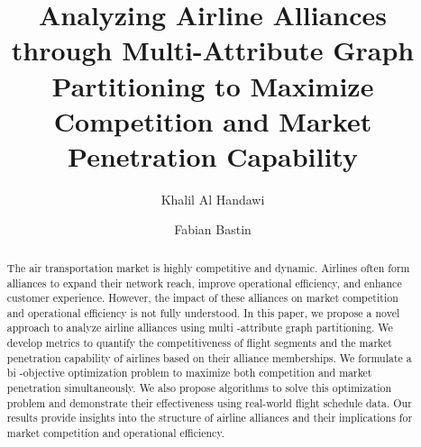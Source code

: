 \documentclass[preprint,times]{elsarticle}
\def\mfabian#1{{\color{black} #1}}
\begin{document}
\begin{frontmatter}




\title{Analyzing Airline Alliances through Multi-Attribute Graph Partitioning to Maximize Competition and Market Penetration Capability}




\author[a]{Khalil Al Handawi} 
\author[b]{Fabian Bastin}

\address[a]{McGill University, Department of Mechanical Engineering, Macdonald-Stewart Building, 817 Sherbrooke W., Montreal, QC, Canada H3A 2T7}
\address[b]{University of Montreal, Department of Computer Science And Operations Research, CP 6128 Succ Centre-Ville, Montreal, QC, Canada  H3C 3J7}

\begin{abstract}

The air transportation market is highly competitive and dynamic. Airlines often form alliances to expand their network reach, improve operational efficiency, and enhance customer experience. However, the impact of these alliances on market competition and operational efficiency is not fully understood. In this paper, we propose a novel approach to analyze airline alliances using multi\mfabian{-}attribute graph partitioning. We develop metrics to quantify the competitiveness of flight segments and the market penetration capability of airlines based on their alliance memberships. We formulate a bi\mfabian{-}objective optimization problem to maximize both competition and market penetration simultaneously. We also propose algorithms to solve this optimization problem and demonstrate their effectiveness using real-world flight schedule data. Our results provide insights into the structure of airline alliances and their implications for market competition and operational efficiency.


\end{abstract}
\end{frontmatter}
\end{document}
